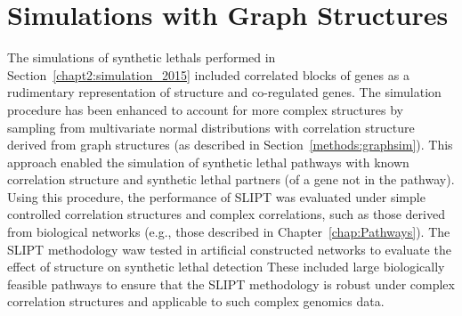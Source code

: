 

\iffalse
\section{Developing a linear model predictor of \glspl{synthetic lethal}}
\subsection{Linear models}
\subsection{Polynomial models}
\subsection{Conditioning}
\subsection{SLIPTv2}
\fi

\section{Simulations with Graph Structures}
\label{chapt5:graphsim}

The simulations of \glspl{synthetic lethal} performed in Section~\ref{chapt2:simulation_2015} included correlated blocks of genes as a rudimentary representation of  structure and co-regulated genes. The simulation procedure has been enhanced to account for more complex  structures by sampling from multivariate normal distributions with correlation structure derived from \gls{graph} structures (as described in Section~\ref{methods:graphsim}). This approach enabled the simulation of \gls{synthetic lethal} pathways with known correlation structure and synthetic lethal partners (of a gene not in the pathway).  Using this procedure, the performance of \gls{SLIPT} was evaluated under simple controlled correlation structures and complex correlations, such as those derived from biological networks (e.g., those described in Chapter~\ref{chap:Pathways}). The \gls{SLIPT} methodology waw tested in artificial constructed networks to evaluate the effect of  structure on \gls{synthetic lethal} detection These included large biologically feasible pathways to ensure that the \gls{SLIPT} methodology is robust under complex correlation structures and applicable to such complex \glspl{genomic} data.

